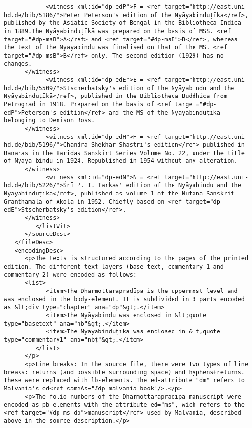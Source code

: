 \documentclass[article,12pt,a4paper]{memoir}
\begin{document}
\begin{verbatim}
            <witness xml:id="dp-edP">P = <ref target="http://east.uni-hd.de/bib/5186/">Peter Peterson's edition of the Nyāyabinduṭīka</ref>, published by the Asiatic Society of Bengal in the Bibliotheca Indica in 1889.The Nyāyabinduṭīkā was prepared on the basis of MSS. <ref target="#dp-msB">A</ref> and <ref target="#dp-msB">B</ref>, whereas the text of the Nyayabindu was finalised on that of the MS. <ref target="#dp-msB">B</ref> only. The second edition (1929) has no changes.
	  </witness>
            <witness xml:id="dp-edE">E = <ref target="http://east.uni-hd.de/bib/5509/">Stscherbatsky's edition of the Nyāyabindu and the Nyāyabinduṭīkā</ref>, published in the Bibliotheca Buddhica from Petrograd in 1918. Prepared on the basis of <ref target="#dp-edP">Peterson's edition</ref> and the MS of the Nyāyabinduṭīkā belonging to Denison Ross.
	  </witness>
            <witness xml:id="dp-edH">H = <ref target="http://east.uni-hd.de/bib/5196/">Chandra Shekhar Shāstrī's edition</ref> published in Banaras in the Haridas Sanskirt Series Volume No. 22, under the title of Nyāya-bindu in 1924. Republished in 1954 without any alteration.
	  </witness>
            <witness xml:id="dp-edN">N = <ref target="http://east.uni-hd.de/bib/5226/">Śrī P. I. Tarkas' edition of the Nyāyabindu and the Nyāyabinduṭīkā</ref>, published as volume 1 of the Nūtana Sanskrit Granthamāla of Akola in 1952. Chiefly based on <ref target="dp-edE">Stscherbatsky's edition</ref>.
	  </witness>
         </listWit>
      </sourceDesc>
   </fileDesc>
   <encodingDesc>
      <p>The texts is structured according to the pages of the printed edition. The different text layers (base-text, commentary 1 and commentary 2) were encoded as follows:
      <list>
            <item>The Dharmottarapradīpa is the uppermost level and was enclosed in the body-element. It is subdivided in 3 parts encoded as &lt;div type="chapter" ana="dp"&gt;.</item>
            <item>The Nyāyabindu was enclosed in &lt;quote type="basetext" ana="nb"&gt;.</item>
            <item>The Nyāyabinduṭīkā was enclosed in &lt;quote type="commentary1" ana="nbṭ"&gt;.</item>
         </list>
      </p>
      <p>Line breaks: In the source file, there were two types of line breaks: returns (and possible surrounding space) and hyphens+returns. These were replaced with lb-elements. The ed-attribute "dm" refers to Malvania's ed<ref sameAs="#dp-malvania-book"/>.</p>
      <p>The folio numbers of the Dharmottarapradīpa-manuscript were encoded as pb-elements with the attribute ed="ms", wich refers to the <ref target="#dp-ms-dp">manuscript</ref> used by Malvania, described above in the source description.</p>

\end{verbatim}
\end{document}

